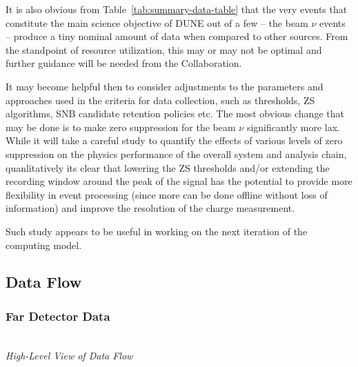\noindent
It is also obvious from Table~\ref{tab:summary-data-table} that the very events that constitute the main science objective of DUNE
out of a few -- the beam $\nu$ events -- produce a tiny nominal amount of data when compared to other sources. From the standpoint
of resource utilization, this may or may not be optimal and further guidance will be needed from the Collaboration.

It may become helpful then to consider adjustments to the parameters and approaches used in the criteria for data collection, such as
thresholds, ZS algorithms, SNB candidate retention policies etc. The most obvious change that may be done is to make zero suppression
for the beam $\nu$ significantly more lax. While it will take a careful study to quantify the effects of various levels of zero suppression
on the physics performance of the overall system and analysis chain, quanlitatively its clear that lowering the ZS thresholds and/or
extending the recording window around the peak of the signal has the potential to provide more flexibility in event processing (since
more can be done offline without loss of information) and improve the resolution of the charge measurement.

Such study appears to be useful in working on the next iteration of the computing model.

\subsection{Data Flow}
\subsubsection{Far Detector Data}
\ 
\\
\noindent
\textit{High-Level View of Data Flow} 
\ 
\\

